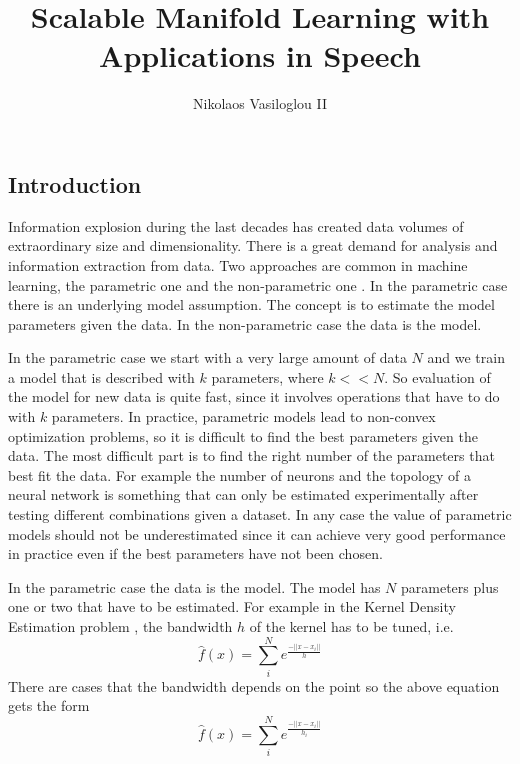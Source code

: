 \documentclass[12pt,letterpaper,doublespaced,ETD,dvips,proposal]{gtthesis}
\title{Scalable Manifold Learning with Applications in Speech}
\author{Nikolaos Vasiloglou II}
\begin{document}
\pagestyle{plain}

\begin{FrontMatter}
\contents %
\end{FrontMatter}

\begin{Body}
\section{Introduction}
\label{intro} Information explosion during the last decades has
created data volumes of extraordinary size and dimensionality. There
is a great demand for analysis and information extraction from data.
Two approaches are common in machine learning, the parametric one
\cite{bishop2006pra, hastie2001esl, haykin1994nnc} and
the non-parametric one \cite{wasserman2006ans}. In the parametric case there is an underlying model
assumption. The concept is to estimate the model parameters given
the data. In the non-parametric case the data is the model.

In the parametric case we start with a very large amount of data $N$
and we train a model that is described with $k$ parameters, where
$k<<N$. So evaluation of the model for new data is quite fast, since
it involves operations that have to do with $k$ parameters. In
practice, parametric models lead to non-convex optimization problems,
so it is difficult to find the best parameters given the data. The
most difficult part is to find the right number of the parameters
that best fit the data. For example the number of neurons and the
topology of a neural network is something that can only be
estimated experimentally after testing different combinations given
a dataset. In any case the value of parametric models should not be
underestimated since it can achieve very good performance in
practice even if the best parameters have not been chosen.

In the parametric case the data is the model. The model has $N$
parameters plus one or two that have to be estimated. For example in
the Kernel Density Estimation problem \cite{Silverman}, the bandwidth $h$ of the
kernel has to be tuned, i.e.
\begin{equation}
\hat{f}(x)=\sum_{i}^{N}e^{\frac{-||x-x_i||}{h}}
\end{equation}
There are cases that the bandwidth depends on the point so the above
equation gets the form
\begin{equation}
\hat{f}(x)=\sum_{i}^{N}e^{\frac{-||x-x_i||}{h_i}}
\end{equation}


\end{Body}
\end{document}
